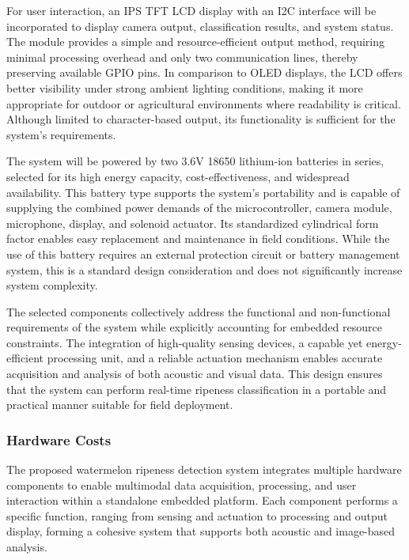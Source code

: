 \begin{thesisprose}
For user interaction, an IPS TFT LCD display with an I2C interface will be incorporated to display camera output, classification results, and system status. The module provides a simple and resource-efficient output method, requiring minimal processing overhead and only two communication lines, thereby preserving available GPIO pins. In comparison to OLED displays, the LCD offers better visibility under strong ambient lighting conditions, making it more appropriate for outdoor or agricultural environments where readability is critical. Although limited to character-based output, its functionality is sufficient for the system’s requirements.

The system will be powered by two 3.6V 18650 lithium-ion batteries in series, selected for its high energy capacity, cost-effectiveness, and widespread availability. This battery type supports the system’s portability and is capable of supplying the combined power demands of the microcontroller, camera module, microphone, display, and solenoid actuator. Its standardized cylindrical form factor enables easy replacement and maintenance in field conditions. While the use of this battery requires an external protection circuit or battery management system, this is a standard design consideration and does not significantly increase system complexity.

The selected components collectively address the functional and non-functional requirements of the system while explicitly accounting for embedded resource constraints. The integration of high-quality sensing devices, a capable yet energy-efficient processing unit, and a reliable actuation mechanism enables accurate acquisition and analysis of both acoustic and visual data. This design ensures that the system can perform real-time ripeness classification in a portable and practical manner suitable for field deployment.


\subsubsection{Hardware Costs}

The proposed watermelon ripeness detection system integrates multiple hardware components to enable multimodal data acquisition, processing, and user interaction within a standalone embedded platform. Each component performs a specific function, ranging from sensing and actuation to processing and output display, forming a cohesive system that supports both acoustic and image-based analysis.


\end{thesisprose}
